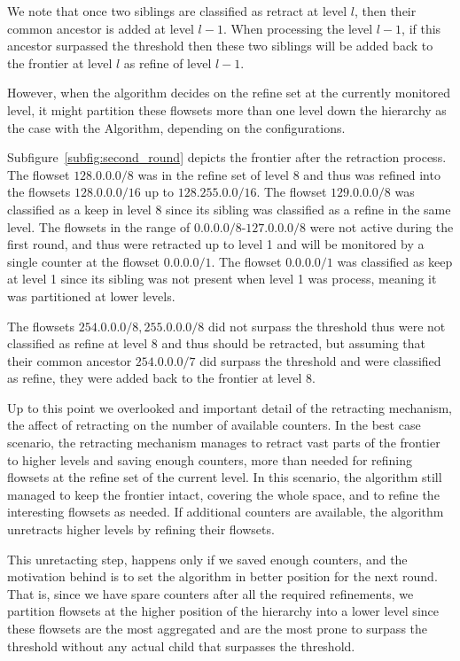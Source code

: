 We note that once  two siblings are classified as retract at level $l$, then their common ancestor is added at level $l-1$. When processing the level $l-1$, if this ancestor surpassed the threshold then these two siblings will be added back to the frontier at level $l$ as refine of level $l-1$.

However, when the algorithm decides on the refine set at the currently monitored level, it might partition these flowsets more than one level down the hierarchy as the case with the \multipleAlgo Algorithm, depending on the configurations.

Subfigure~\ref{subfig:second_round} depicts the frontier after the retraction process. The flowset $128.0.0.0/8$ was in the refine set of level 8 and thus was refined into the flowsets $128.0.0.0/16$ up to $128.255.0.0/16$. The flowset $129.0.0.0/8$ was classified as a keep in level 8 since its sibling was classified as a refine in the same level. The flowsets in the range of $0.0.0.0/8$-$127.0.0.0/8$ were not active during the first round, and thus were retracted up to level 1 and will be monitored by a single counter at the flowset $0.0.0.0/1$. The flowset $0.0.0.0/1$ was classified as keep at level 1 since its sibling was not present when level 1 was process, meaning it was partitioned at lower levels.

The flowsets $254.0.0.0/8, 255.0.0.0/8$ did not surpass the threshold thus were not classified as refine at level 8 and thus should be retracted, but assuming that their common ancestor $254.0.0.0/7$ did surpass the threshold and were classified as refine, they were added back to the frontier at level 8.

Up to this point we overlooked and important detail of the retracting mechanism, the affect of retracting on the number of available counters. In the best case scenario, the retracting mechanism manages to retract vast parts of the frontier to higher levels and saving enough counters, more than needed for refining flowsets at the refine set of the current level. In this scenario, the algorithm still managed to keep the frontier intact, covering the whole space, and to refine the interesting flowsets as needed.
If additional counters are available, the algorithm unretracts higher levels by refining their flowsets.

This unretacting step, happens only if we saved enough counters, and the motivation behind is to set the algorithm in better position for the next round. That is, since we have spare counters after all the required refinements, we partition flowsets at the higher position of the hierarchy into a lower level since these flowsets are the most aggregated and are the most prone to surpass the threshold without any actual child that surpasses the threshold.

